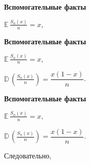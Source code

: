 \documentclass[11pt]{article}
\begin{document}
\newpage

\begin{center}
{\color{notaeYELLOW}\bfseries\fontsize{44}{52}\selectfont Вспомогательные факты}
\end{center}
\vspace*{\fill}
\begin{center}
\fontsize{36}{43}\selectfont
$\mathbb{E}\, \frac{S_n(x)}{n} = x,$\par\vspace{0.4in}
\end{center}
\vspace*{\fill}

\newpage

\begin{center}
{\color{notaeYELLOW}\bfseries\fontsize{44}{52}\selectfont Вспомогательные факты}
\end{center}
\vspace*{\fill}
\begin{center}
\fontsize{36}{43}\selectfont
$\mathbb{E}\, \frac{S_n(x)}{n} = x,$\par\vspace{0.4in}
$\mathbb{D}\, \left(\frac{S_n(x)}{n}\right)= \dfrac{x(1-x)}{n}$. \par\vspace{0.4in}
\end{center}
\vspace*{\fill}

\newpage

\begin{center}
{\color{notaeYELLOW}\bfseries\fontsize{44}{52}\selectfont Вспомогательные факты}
\end{center}
\vspace*{\fill}
\begin{center}
\fontsize{36}{43}\selectfont
$\mathbb{E}\, \frac{S_n(x)}{n} = x,$\par\vspace{0.4in}
$\mathbb{D}\, \left(\frac{S_n(x)}{n}\right)= \dfrac{x(1-x)}{n}$. \par\vspace{0.4in}
Следовательно,\par\vspace{0.4in}
\end{center}
\vspace*{\fill}

\newpage
\end{document}
